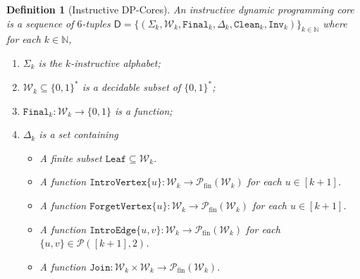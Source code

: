 \documentclass[11pt,a4paper]{article}
\newtheorem{definition}[theorem]{Definition}
\newcommand{\falsevalue}{0}
\newcommand{\truevalue}{1}
\newcommand{\treewidthvalue}{k}
\newcommand{\N}{\mathbb{N}}
\newcommand{\introvertexgeneric}[1]{\mathtt{IntroVertex}\{#1\}}
\newcommand{\introedgegeneric}[2]{\mathtt{IntroEdge}\{#1,#2\}}
\newcommand{\forgetvertexgeneric}[1]{\mathtt{ForgetVertex}\{#1\}}
\newcommand{\joingenericcore}{\mathtt{Join}}
\newcommand{\initialsetgenericcore}{\mathtt{Leaf}}
\newcommand{\finalwitnessgenericcore}{\mathtt{Final}}
\newcommand{\cleaningfunctioncore}{\mathtt{Clean}}
\newcommand{\asymbol}{a}
\newcommand{\arity}{\mathfrak{a}}
\newcommand{\vertexone}{u}
\newcommand{\vertextwo}{v}
\newcommand{\allwitnesses}{\mathcal{W}}
\newcommand{\finitepowerset}[1]{\mathcal{P}_{\mathrm{fin}}(#1)}
\newcommand{\powersetchoosek}[2]{\mathcal{P}(#1,#2)}
\newcommand{\dpcore}{\mathsf{D}}
\newcommand{\invariantCore}{\mathtt{Inv}}
\newcommand{\alphabetclass}{\Sigma}
\newcommand{\transitionsdpcore}{\Delta}
\begin{document}
\begin{definition}[Instructive DP-Cores]
\label{definition:DynamicSignature}
An \emph{instructive dynamic programming core} is a sequence of $6$-tuples
$\dpcore = \{(\alphabetclass_{\treewidthvalue},\allwitnesses_{\treewidthvalue},\finalwitnessgenericcore_{\treewidthvalue},\transitionsdpcore_{\treewidthvalue},\cleaningfunctioncore_{\treewidthvalue}, \invariantCore_{\treewidthvalue})\}_{\treewidthvalue\in \N}$ where for each $\treewidthvalue\in \N$,
\begin{enumerate}
\item $\alphabetclass_{\treewidthvalue}$ is the $\treewidthvalue$-instructive alphabet;
\item $\allwitnesses_{\treewidthvalue}\subseteq \{0,1\}^*$ is a decidable subset of $\{0,1\}^*$;
\item $\finalwitnessgenericcore_{\treewidthvalue}: \allwitnesses_{\treewidthvalue}\rightarrow \{\falsevalue,\truevalue\}$ is a function;
\item $\transitionsdpcore_{\treewidthvalue}$ is a set containing
\begin{itemize}
\item A {\em finite} subset $\initialsetgenericcore\subseteq \allwitnesses_{\treewidthvalue}$.
\item A function $\introvertexgeneric{\vertexone}:\allwitnesses_{\treewidthvalue}\rightarrow \finitepowerset{\allwitnesses_{\treewidthvalue}}$ for each $\vertexone\in [\treewidthvalue+1]$.
\item A function $\forgetvertexgeneric{\vertexone}:\allwitnesses_{\treewidthvalue} \rightarrow \finitepowerset{\allwitnesses_{\treewidthvalue}}$ for each
		$\vertexone\in [\treewidthvalue+1]$.
\item A function $\introedgegeneric{\vertexone}{\vertextwo}:\allwitnesses_{\treewidthvalue}\rightarrow\finitepowerset{\allwitnesses_{\treewidthvalue}}$ for each $\{\vertexone,\vertextwo\}\in \powersetchoosek{[\treewidthvalue+1]}{2}$.
\item A function $\joingenericcore:\allwitnesses_{\treewidthvalue} \times \allwitnesses_{\treewidthvalue} \rightarrow \finitepowerset{\allwitnesses_{\treewidthvalue}}$.

\end{itemize}
\end{enumerate}
\end{definition}
\end{document}
